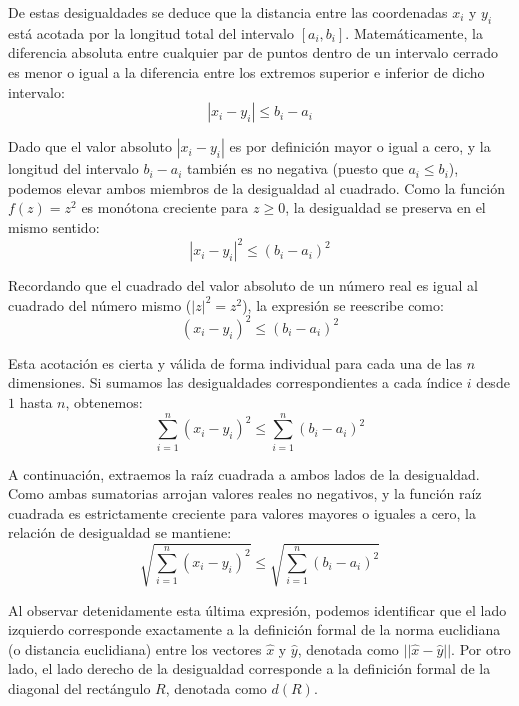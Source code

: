 \documentclass[11pt,letterpaper]{article}
\begin{document}
De estas desigualdades se deduce que la distancia entre las coordenadas $x_{i}$ y $y_{i}$ está acotada por la longitud total del intervalo $[a_{i}, b_{i}]$. Matemáticamente, la diferencia absoluta entre cualquier par de puntos dentro de un intervalo cerrado es menor o igual a la diferencia entre los extremos superior e inferior de dicho intervalo:
\begin{equation*}
|x_{i} - y_{i}| \le b_{i} - a_{i}
\end{equation*}

Dado que el valor absoluto $|x_{i} - y_{i}|$ es por definición mayor o igual a cero, y la longitud del intervalo $b_{i} - a_{i}$ también es no negativa (puesto que $a_{i} \le b_{i}$), podemos elevar ambos miembros de la desigualdad al cuadrado. Como la función $f(z) = z^{2}$ es monótona creciente para $z \ge 0$, la desigualdad se preserva en el mismo sentido:
\begin{equation*}
|x_{i} - y_{i}|^{2} \le (b_{i} - a_{i})^{2}
\end{equation*}

Recordando que el cuadrado del valor absoluto de un número real es igual al cuadrado del número mismo ($|z|^{2} = z^{2}$), la expresión se reescribe como:
\begin{equation*}
(x_{i} - y_{i})^{2} \le (b_{i} - a_{i})^{2}
\end{equation*}

Esta acotación es cierta y válida de forma individual para cada una de las $n$ dimensiones. Si sumamos las desigualdades correspondientes a cada índice $i$ desde $1$ hasta $n$, obtenemos:
\begin{equation*}
\sum_{i=1}^{n} (x_{i} - y_{i})^{2} \le \sum_{i=1}^{n} (b_{i} - a_{i})^{2}
\end{equation*}

A continuación, extraemos la raíz cuadrada a ambos lados de la desigualdad. Como ambas sumatorias arrojan valores reales no negativos, y la función raíz cuadrada es estrictamente creciente para valores mayores o iguales a cero, la relación de desigualdad se mantiene:
\begin{equation*}
\sqrt{\sum_{i=1}^{n} (x_{i} - y_{i})^{2}} \le \sqrt{\sum_{i=1}^{n} (b_{i} - a_{i})^{2}}
\end{equation*}

Al observar detenidamente esta última expresión, podemos identificar que el lado izquierdo corresponde exactamente a la definición formal de la norma euclidiana (o distancia euclidiana) entre los vectores $\hat{x}$ y $\hat{y}$, denotada como $||\hat{x}-\hat{y}||$. Por otro lado, el lado derecho de la desigualdad corresponde a la definición formal de la diagonal del rectángulo $R$, denotada como $d(R)$.
\end{document}
